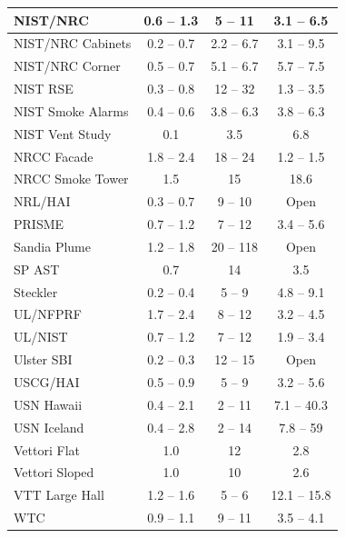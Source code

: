 \begin{table}[!t]
\begin{tabular}{|l|c|c|c|}
NIST/NRC            & 0.6 -- 1.3    & 5 -- 11       & 3.1 -- 6.5    \\ \hline
NIST/NRC Cabinets   & 0.2 -- 0.7    & 2.2 -- 6.7    & 3.1 -- 9.5    \\ \hline
NIST/NRC Corner     & 0.5 -- 0.7    & 5.1 -- 6.7    & 5.7 -- 7.5    \\ \hline
NIST RSE            & 0.3 -- 0.8    & 12 -- 32      & 1.3 -- 3.5    \\ \hline
NIST Smoke Alarms   & 0.4 -- 0.6    & 3.8 -- 6.3    & 3.8 -- 6.3    \\ \hline
NIST Vent Study     & 0.1           & 3.5           & 6.8           \\ \hline
NRCC Facade         & 1.8 -- 2.4    & 18 -- 24      & 1.2 -- 1.5    \\ \hline
NRCC Smoke Tower    & 1.5           & 15            & 18.6          \\ \hline
NRL/HAI             & 0.3 -- 0.7    & 9 -- 10       & Open          \\ \hline
PRISME              & 0.7 -- 1.2    & 7 -- 12       & 3.4 -- 5.6    \\ \hline
Sandia Plume        & 1.2 -- 1.8    & 20 -- 118     & Open          \\ \hline
SP AST              & 0.7           & 14            & 3.5           \\ \hline
Steckler            & 0.2 -- 0.4    & 5 -- 9        & 4.8 -- 9.1    \\ \hline
UL/NFPRF            & 1.7 -- 2.4    & 8 -- 12       & 3.2 -- 4.5    \\ \hline
UL/NIST             & 0.7 -- 1.2    & 7 -- 12       & 1.9 -- 3.4    \\ \hline
Ulster SBI          & 0.2 -- 0.3    & 12 -- 15      & Open          \\ \hline
USCG/HAI            & 0.5 -- 0.9    & 5 -- 9        & 3.2 -- 5.6    \\ \hline
USN Hawaii          & 0.4 -- 2.1    & 2 -- 11       & 7.1 -- 40.3   \\ \hline
USN Iceland         & 0.4 -- 2.8    & 2 -- 14       & 7.8 -- 59     \\ \hline
Vettori Flat        & 1.0           & 12            & 2.8           \\ \hline
Vettori Sloped      & 1.0           & 10            & 2.6           \\ \hline
VTT Large Hall      & 1.2 -- 1.6    & 5 -- 6        & 12.1 -- 15.8  \\ \hline
WTC                 & 0.9 -- 1.1    & 9 -- 11       & 3.5 -- 4.1    \\ \hline
\end{tabular}
\label{Numerical_Parameters}
\nopagebreak
\end{table}





